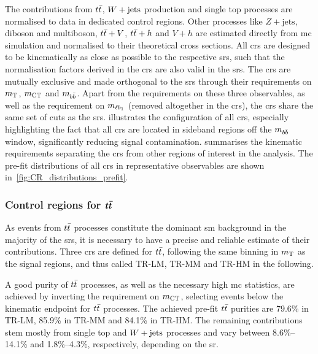 The contributions from $\ttbar$, $W+\mathrm{jets}$ production and single top processes are normalised to data in dedicated control regions.
Other processes like $Z+\mathrm{jets}$, diboson and multiboson, $t\bar{t}+V$, $t\bar{t}+h$ and $V+h$ are estimated directly from \gls{mc} simulation and normalised to their theoretical cross sections.
All \glspl{cr} are designed to be kinematically as close as possible to the respective \glspl{sr}, such that the normalisation factors derived in the \glspl{cr} are also valid in the \glspl{sr}.
The \glspl{cr} are mutually exclusive and made orthogonal to the \glspl{sr} through their requirements on $m_{\textrm{T}}$, $m_{\textrm{CT}}$ and $m_{b\bar{b}}$.
Apart from the requirements on these three observables, as well as the requirement on $m_{\ell b_{1}}$ (removed altogether in the \glspl{cr}), the \glspl{cr} share the same set of cuts as the \glspl{sr}.
 illustrates the configuration of all \glspl{cr}, especially highlighting the fact that all \glspl{cr} are located in sideband regions off the $m_{b\bar{b}}$ window, significantly reducing signal contamination.
 summarises the kinematic requirements separating the \glspl{cr} from other regions of interest in the analysis. The pre-fit distributions of all \glspl{cr} in representative observables are shown in~\cref{fig:CR_distributions_prefit}.

\subsubsection[Control regions for $\ttbar$]{Control regions for $\makemebold{\ttbar}$}

As events from $\ttbar$ processes constitute the dominant \gls{sm} background in the majority of the \glspl{sr}, it is necessary to have a precise and reliable estimate of their contributions.
Three \glspl{cr} are defined for $\ttbar$, following the same binning in $m_{\textrm{T}}$ as the signal regions, and thus called TR-LM, TR-MM and TR-HM in the following.

A good purity of $\ttbar$ processes, as well as the necessary high \gls{mc} statistics, are achieved by inverting the requirement on $m_{\textrm{CT}}$, selecting events below the kinematic endpoint for $\ttbar$ processes.
The achieved pre-fit $\ttbar$ purities are 79.6\% in TR-LM, 85.9\% in TR-MM and 84.1\% in TR-HM.
The remaining contributions stem mostly from single top and $W+\mathrm{jets}$ processes and vary between 8.6\%--14.1\% and 1.8\%--4.3\%, respectively, depending on the \gls{sr}. 

